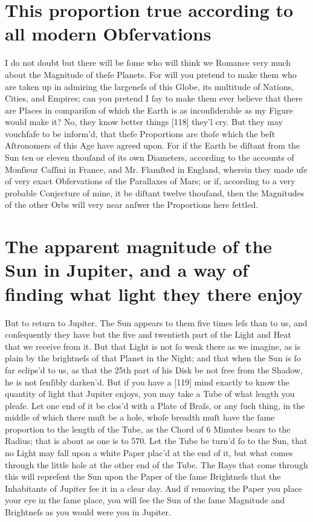 \documentclass[letterpaper]{book}
\begin{document}
\section{This proportion true according to all modern Obſervations}

I do not doubt but there will be ſome who will think we Romance very
much about the Magnitude of theſe Planets. For will you pretend to make
them who are taken up in admiring the largeneſs of this Globe, its multitude
of Nations, Cities, and Empires; can you pretend I ſay to make them ever
believe that there are Places in compariſon of which the Earth is as inconſiderable as my Figure would make it? No, they know better things [118]
they'l cry. But they may vouchſafe to be inform'd, that theſe Proportions
are thoſe which the beſt Aſtronomers of this Age have agreed upon. For
if the Earth be diſtant from the Sun ten or eleven thouſand of its own Diameters, according to the accounts of Monſieur Caſſini in France, and Mr.
Flamſted in England, wherein they made uſe of very exact Obſervations of
the Parallaxes of Mars; or if, according to a very probable Conjecture of
mine, it be diſtant twelve thouſand, then the Magnitudes of the other Orbs
will very near anſwer the Proportions here ſettled.


\section{The apparent magnitude of the Sun in Jupiter, and a way of finding
what light they there enjoy}

But to return to Jupiter. The Sun appears to them five times leſs than to
us, and conſequently they have but the five and twentieth part of the Light
and Heat that we receive from it. But that Light is not ſo weak there as we
imagine, as is plain by the brightneſs of that Planet in the Night; and that
when the Sun is ſo far eclips'd to us, as that the 25th part of his Disk be
not free from the Shadow, he is not ſenſibly darken'd. But if you have a
[119] mind exactly to know the quantity of light that Jupiter enjoys, you
may take a Tube of what length you pleaſe. Let one end of it be clos'd with a
Plate of Braſs, or any ſuch thing, in the middle of which there muſt be a
hole, whoſe breadth muſt have the ſame proportion to the length of the Tube,
as the Chord of 6 Minutes bears to the Radius; that is about as one is to
570.  Let the Tube be turn'd ſo to the Sun, that no Light may fall upon a
white Paper plac'd at the end of it, but what comes through the little hole
at the other end of the Tube. The Rays that come through this will repreſent
the Sun upon the Paper of the ſame Brightneſs that the Inhabitants of
Jupiter ſee it in a clear day. And if removing the Paper you place your eye
in the ſame place, you will ſee the Sun of the ſame Magnitude and Brightneſs
as you would were you in Jupiter.
\end{document}

